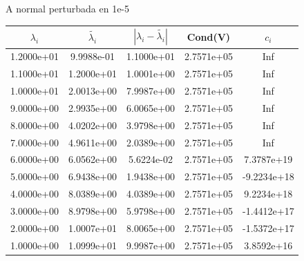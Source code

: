 \documentclass{article}
\begin{document}
\begin{itemize}
\begin{enumerate}[(a)]
\begin{figure}[h!]
\begin{tabular}{c|c|c|c|c}
\end{tabular}
\caption{A normal perturbada en 1e-5}
\end{figure}
\begin{figure}[h!]
\centering
\begin{tabular}{c|c|c|c|c}
$\lambda_{i}$&$\tilde{\lambda_{i}}$ &$|\lambda_{i}-\tilde{\lambda_{i}}|$ &Cond(V) &$c_i$\\
\hline
1.2000e+01&9.9988e-01&1.1000e+01&2.7571e+05&Inf\\
\hline
1.1000e+01&1.2000e+01&1.0001e+00&2.7571e+05&Inf\\
\hline
1.0000e+01&2.0013e+00&7.9987e+00&2.7571e+05&Inf\\
\hline
9.0000e+00&2.9935e+00&6.0065e+00&2.7571e+05&Inf\\
\hline
8.0000e+00&4.0202e+00&3.9798e+00&2.7571e+05&Inf\\
\hline
7.0000e+00&4.9611e+00&2.0389e+00&2.7571e+05&Inf\\
\hline
6.0000e+00&6.0562e+00&5.6224e-02&2.7571e+05&7.3787e+19\\
\hline
5.0000e+00&6.9438e+00&1.9438e+00&2.7571e+05&-9.2234e+18\\
\hline
4.0000e+00&8.0389e+00&4.0389e+00&2.7571e+05&9.2234e+18\\
\hline
3.0000e+00&8.9798e+00&5.9798e+00&2.7571e+05&-1.4412e+17\\
\hline
2.0000e+00&1.0007e+01&8.0065e+00&2.7571e+05&-1.5372e+17\\
\hline
1.0000e+00&1.0999e+01&9.9987e+00&2.7571e+05&3.8592e+16\\
\hline


\end{tabular}
\end{figure}
\end{enumerate}
\end{itemize}
\end{document}
